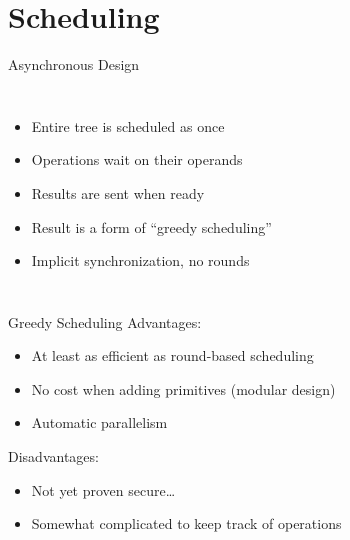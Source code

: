 \documentclass[t,noamsthm]{beamer}
\begin{document}
\section{Scheduling}

\begin{frame}{Asynchronous Design}

  \begin{columns}




    \begin{itemize}
    \item Entire tree is scheduled as once
    \item Operations wait on their operands
    \item Results are sent when ready
    \item Result is a form of ``greedy scheduling''
    \item Implicit synchronization, no rounds
    \end{itemize}

  \end{columns}

\end{frame}

\begin{frame}{Greedy Scheduling}
  Advantages:
  \begin{itemize}
  \item At least as efficient as round-based scheduling
  \item No cost when adding primitives (modular design)
  \item Automatic parallelism
  \end{itemize}

  Disadvantages:
  \begin{itemize}
  \item Not yet proven secure\dots
  \item Somewhat complicated to keep track of operations
  \end{itemize}
\end{frame}
\end{document}
